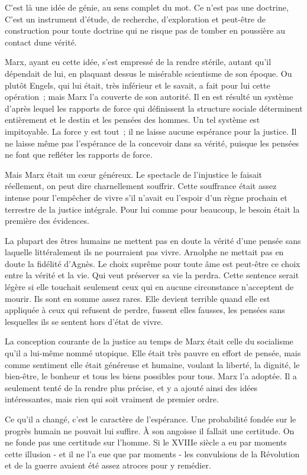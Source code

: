 \documentclass[french,twoside]{book} %
\begin{document}
C'est là une idée de génie, au sens complet du mot. Ce n'est pas une doctrine, C'est un instrument d'étude, de recherche, d’exploration et peut-être de construction pour toute doctrine qui ne risque pas de tomber en poussière au contact dune vérité.\par
Marx, ayant eu cette idée, s'est empressé de la rendre stérile, autant qu'il dépendait de lui, en plaquant dessus le misérable scientisme de son époque. Ou plutôt Engels, qui lui était, très inférieur et le savait, a fait pour lui cette opération ; mais Marx l'a couverte de son autorité. Il en est résulté un système d'après lequel les rapports de force qui définissent la structure sociale déterminent entièrement et le destin et les pensées des hommes. Un tel système est impitoyable. La force y est tout ; il ne laisse aucune espérance pour la justice. Il ne laisse même pas l'espérance de la concevoir dans sa vérité, puisque les pensées ne font que refléter les rapports de force.\par
Mais Marx était un cœur généreux. Le spectacle de l'injustice le faisait réellement, on peut dire charnellement souffrir. Cette souffrance était assez intense pour l'empêcher de vivre s'il n'avait eu l'espoir d'un règne prochain et terrestre de la justice intégrale. Pour lui comme pour beaucoup, le besoin était la première des évidences.\par
La plupart des êtres humains ne mettent pas en doute la vérité d'une pensée sans laquelle littéralement ils ne pourraient pas vivre. Arnolphe ne mettait pas en doute la fidélité d'Agnès. Le choix suprême pour toute âme est peut-être ce choix entre la vérité et la vie. Qui veut préserver sa vie la perdra. Cette sentence serait légère si elle touchait seulement ceux qui en aucune circonstance n'acceptent de mourir. Ils sont en somme assez rares. Elle devient terrible quand elle est appliquée à ceux qui refusent de perdre, fussent elles fausses, les pensées sans lesquelles ils se sentent hors d'état de vivre.\par
La conception courante de la justice au temps de Marx était celle du socialisme qu'il a lui-même nommé utopique. Elle était très pauvre en effort de pensée, mais comme sentiment elle était généreuse et humaine, voulant la liberté, la dignité, le bien-être, le bonheur et tous les biens possibles pour tous. Marx l'a adoptée. Il a seulement tenté de la rendre plus précise, et y a ajouté ainsi des idées intéressantes, mais rien qui soit vraiment de premier ordre.\par
Ce qu'il a changé, c'est le caractère de l'espérance. Une probabilité fondée sur le progrès humain ne pouvait lui suffire. À son angoisse il fallait une certitude. On ne fonde pas une certitude sur l'homme. Si le XVIIIe siècle a eu par moments cette illusion - et il ne l'a eue que par moments - les convulsions de la Révolution et de la guerre avaient été assez atroces pour y remédier.\par
\end{document}

